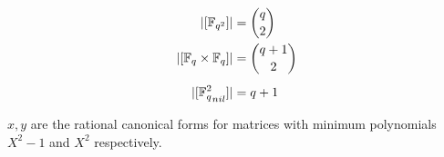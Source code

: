 \documentclass{amsart}
\begin{document}
\begin{theorem}
    \begin{align}
        |[\protect\mathbb{F}_{q^2}]|                  &= \binom{q}{2} \\
        |[\protect\mathbb{F}_q \times \protect\mathbb{F}_q]|         &= \binom{q + 1}{2} \\[0.5em]
        |[{\protect\mathbb{F}_q^2}_{nil}]|            &= q + 1
    \end{align}
\end{theorem}
$x, y$ are the rational canonical forms for matrices with minimum polynomials $X^2 - 1$ and $X^2$ respectively.
\end{document}
